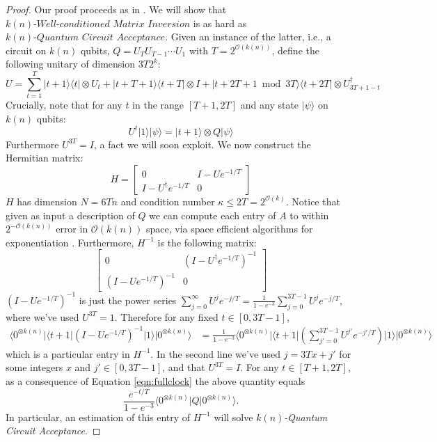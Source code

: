 \documentclass[11pt]{article}
\theoremstyle{definition}
\theoremstyle{remark}
\newcommand\matrixinvert[1]{{\ensuremath{#1}}\textit{-Well-conditioned Matrix Inversion}}
\newcommand\qca[1]{\ensuremath{#1}\textit{-Quantum Circuit Acceptance}}
\newcommand{\zero}{\ensuremath{0^{\otimes{k(n)}}}}
\newcommand\bigoh{\mathcal{O}}
\begin{document}
\begin{proof}
Our proof proceeds as in \cite{HHL}.  We will show that $\matrixinvert{k(n)}$ is as hard as $\qca{k(n)}$.  Given an instance of the latter, i.e., a circuit on $k(n)$ qubits, $Q=U_TU_{T-1}\cdots U_1$ with $T = 2^{\mathcal{O}(k(n))}$, define the following unitary of dimension $3T2^k$:
\[U=\sum_{t=1}^{T}|t+1\rangle\langle t|\otimes U_t+|t+T+1\rangle\langle t+T|\otimes I+|t+2T+1\bmod{3T}\rangle\langle t+2T|\otimes U_{3T+1-t}^{\dagger}\]	
Crucially, note that for any $t$ in the range $[T+1,2T]$ and any state $|\psi\rangle$ on $k(n)$ qubits: 
\begin{equation}\label{eqn:fullclock}
	U^t|1\rangle|\psi\rangle=|t+1\rangle\otimes Q|\psi\rangle
\end{equation}
Furthermore $U^{3T}=I$, a fact we will soon exploit. We now construct the Hermitian matrix:
\begin{equation}
H=\begin{bmatrix}
    0 & I-Ue^{-1/T}\\
   I-U^{\dagger}e^{-1/T} &  0
\end{bmatrix}
\end{equation}
 $H$ has dimension $N=6Tn$ and condition number $\kappa\leq 2T=2^{\bigoh (k)}$.  Notice that given as input a description of $Q$ we can compute each entry of $A$ to within $2^{-\mathcal{O}(k(n))}$ error in $\mathcal{O}(k(n))$ space, via space efficient algorithms for exponentiation \cite{reif}.
   Furthermore, $H^{-1}$ is the following matrix:
\begin{equation}
\begin{bmatrix}
    0 & \left(I-U^\dagger e^{-1/T}\right)^{-1}\\
   \left(I-Ue^{-1/T}\right)^{-1} &  0
\end{bmatrix}
\end{equation}
$\left(I-Ue^{-1/T}\right)^{-1}$ is just the power series $\sum_{j=0}^\infty U^j e^{-j/T}=\frac{1}{1-e^{-3}}\sum_{j=0}^{3T-1} U^{j} e^{-j/T}$, where we've used $U^{3T}=1$. Therefore for any fixed $t \in [0,3T-1]$,
 \begin{align}
\langle\zero|\langle t+1|\left(I-Ue^{-1/T}\right)^{-1}|1\rangle|\zero\rangle
&= \frac{1}{1-e^{-3}}\langle\zero|\langle t+1|\left(\sum_{j'=0}^{3T-1} U^{j'} e^{-j'/T}\right)|1\rangle|\zero\rangle
\end{align}
which is a particular entry in $H^{-1}$. In the second line we've used $j = 3Tx + j'$ for some integers $x$ and $j' \in [0,3T-1]$, and that $U^{3T}=I$.  For any $t \in [T+1,2T]$, as a consequence of Equation \ref{eqn:fullclock} the above quantity equals
\begin{equation}
\frac{e^{-t/T}}{1-e^{-3}}\langle\zero|Q|\zero\rangle.
\end{equation}
In particular, an estimation of this entry of $H^{-1}$ will solve \qca{k(n)}.
\end{proof}
\end{document}
